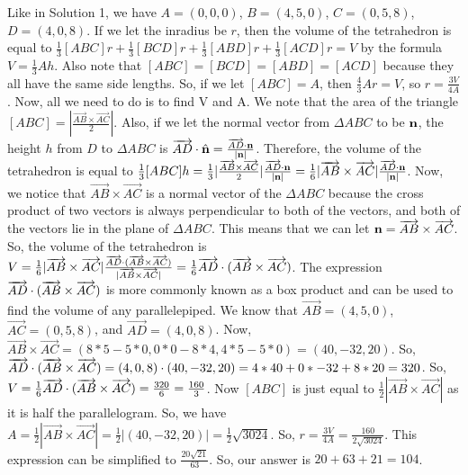 \begin{enumerate}
Like in Solution 1, we have $A = (0,0,0)$, $B = (4,5,0)$, $C = (0,5,8)$, $D = (4,0,8)$. If we let the inradius be $r$, then the volume of the tetrahedron is equal to $\frac{1}{3}[ABC]r + \frac{1}{3}[BCD]r + \frac{1}{3}[ABD]r + \frac{1}{3}[ACD]r = V$ by the formula $V = \frac{1}{3}Ah$. Also note that $[ABC] = [BCD] = [ABD] = [ACD]$ because they all have the same side lengths. So, if we let $[ABC] = A$, then $\frac{4}{3}Ar = V$, so $r = \frac{3V}{4A}$. Now, all we need to do is to find V and A. We note that the area of the triangle $[ABC] = |\frac{\overrightarrow{AB}\times\overrightarrow{AC}}{2}|$. Also, if we let the normal vector from $\Delta ABC$ to be $\bold{n}$, the height $h$ from $D$ to $\Delta ABC$ is $\overrightarrow{AD} \cdot \hat{\bold{n}} = \frac{\overrightarrow{AD} \cdot \bold{n}}{\bold{|n|}}$. Therefore, the volume of the tetrahedron is equal to $\frac{1}{3}[ABC]h = \frac{1}{3}|\frac{\overrightarrow{AB}\times\overrightarrow{AC}}{2}|\frac{\overrightarrow{AD} \cdot \bold{n}}{\bold{|n|}} = \frac{1}{6}|\overrightarrow{AB}\times\overrightarrow{AC}|\frac{\overrightarrow{AD} \cdot \bold{n}}{\bold{|n|}}$. Now, we notice that $\overrightarrow{AB}\times\overrightarrow{AC}$ is a normal vector of the $\Delta ABC$ because the cross product of two vectors is always perpendicular to both of the vectors, and both of the vectors lie in the plane of $\Delta ABC$. This means that we can let $\bold{n} = \overrightarrow{AB}\times\overrightarrow{AC}$. So, the volume of the tetrahedron is $V = \frac{1}{6}|\overrightarrow{AB}\times\overrightarrow{AC}|\frac{\overrightarrow{AD} \cdot (\bold{\overrightarrow {AB}\times\overrightarrow{AC}})}{\bold{|\overrightarrow{AB}\times\overrightarrow{AC}|}} = \frac{1}{6}\overrightarrow{AD} \cdot (\bold{\overrightarrow{AB}\times\overrightarrow{AC}})$. The expression $\overrightarrow{AD} \cdot (\bold{\overrightarrow{AB}\times\overrightarrow{AC}})$ is more commonly known as a box product and can be used to find the volume of any parallelepiped. We know that $\overrightarrow{AB} = (4,5,0)$, $\overrightarrow{AC} = (0,5,8)$, and $\overrightarrow{AD} = (4,0,8)$. Now, $\overrightarrow{AB} \times \overrightarrow{AC} = (8*5-5*0, 0*0-8*4, 4*5-5*0) = (40, -32, 20)$. So, $\overrightarrow{AD} \cdot (\bold{\overrightarrow{AB}\times\overrightarrow{AC}}) = (4,0,8) \cdot (40,-32,20) = 4*40 + 0*-32 + 8*20 = 320$. So, $V = \frac{1}{6}\overrightarrow{AD} \cdot (\bold{\overrightarrow{AB}\times\overrightarrow{AC}}) = \frac{320}{6} = \frac{160}{3}$. Now $[ABC]$ is just equal to $\frac{1}{2}|\overrightarrow{AB} \times \overrightarrow{AC}|$ as it is half the parallelogram. So, we have $A = \frac{1}{2}|\overrightarrow{AB} \times \overrightarrow{AC}| = \frac{1}{2}|(40,-32,20)| = \frac{1}{2}\sqrt{3024}$. So, $r = \frac{3V}{4A} = \frac{160}{2\sqrt{3024}}$. This expression can be simplified to $\frac{20\sqrt{21}}{63}$. So, our answer is $20 + 63 + 21 = \boxed{104}$.


\end{enumerate}

